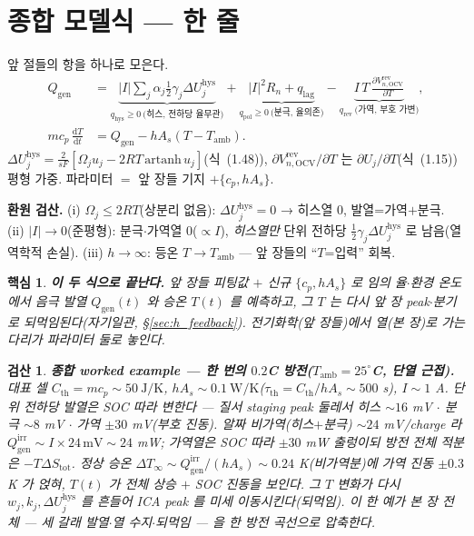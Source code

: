 \documentclass[11pt,a4paper]{article}
\newtheorem*{keybox}{핵심}
\newtheorem*{verifybox}{검산}
\newcommand{\dd}{\mathrm{d}}
\newcommand{\OCV}{\mathrm{OCV}}
\newcommand{\hys}{\mathrm{hys}}
\newcommand{\pol}{\mathrm{pol}}
\newcommand{\rev}{\mathrm{rev}}
\newcommand{\irr}{\mathrm{irr}}
\newcommand{\gen}{\mathrm{gen}}
\newcommand{\amb}{\mathrm{amb}}
\newcommand{\Th}{\mathrm{th}}
\newcommand{\lag}{\mathrm{lag}}
\begin{document}
\section{종합 모델식 — 한 줄}\label{sec:h_master}
앞 절들의 항을 하나로 모은다.
\begin{equation}
\boxed{\;\begin{aligned}
Q_\gen&=\underbrace{|I|\textstyle\sum_j\alpha_j\tfrac12\gamma_j\Delta U_j^\hys}_{q_\hys\ge0\ \text{(히스, 전하당 율무관)}}
+\underbrace{|I|^2R_n+q_\lag}_{q_\pol\ge0\ \text{(분극, 율의존)}}
-\underbrace{I\,T\,\frac{\partial V_{n,\OCV}^\rev}{\partial T}}_{q_\rev\ \text{(가역, 부호 가변)}},\\[3pt]
m c_p\,\frac{\dd T}{\dd t}&=Q_\gen-hA_s(T-T_\amb).
\end{aligned}\;}
\label{eq:h_master}
\end{equation}
$\Delta U_j^\hys=\tfrac{2}{sF}[\Omega_j u_j-2RT\,\mathrm{artanh}\,u_j]$(식~(1.48)), $\partial V_{n,\OCV}^\rev/\partial T$ 는
$\partial U_j/\partial T$(식~(1.15)) 평형 가중. 파라미터 $=$ 앞 장들 기지 $+\{c_p,hA_s\}$.

\textbf{환원 검산.} (i) $\Omega_j\le2RT$(상분리 없음): $\Delta U_j^\hys=0$ → 히스열 $0$, 발열=가역$+$분극. (ii)
$|I|\to0$(준평형): 분극$\cdot$가역열 $0$($\propto I$), \emph{히스열만} 단위 전하당 $\tfrac12\gamma_j\Delta U_j^\hys$ 로
남음(열역학적 손실). (iii) $h\to\infty$: 등온 $T\to T_\amb$ — 앞 장들의 ``$T$=입력'' 회복.
\begin{keybox}
\textbf{이 두 식으로 끝난다.} 앞 장들 피팅값 $+$ 신규 $\{c_p,hA_s\}$ 로 임의 율$\cdot$환경 온도에서 음극
발열 $Q_\gen(t)$ 와 승온 $T(t)$ 를 예측하고, 그 $T$ 는 다시 앞 장 peak$\cdot$분기로 되먹임된다(자기일관,
\S\ref{sec:h_feedback}). 전기화학(앞 장들)에서 열(본 장)로 가는 다리가 파라미터 \emph{둘}로 놓인다.
\end{keybox}
\begin{verifybox}
\textbf{종합 worked example — 한 번의 $0.2$C 방전($T_\amb=25^\circ$C, 단열 근접).} 대표 셀 $C_\Th=mc_p\sim50\
\mathrm{J/K}$, $hA_s\sim0.1\ \mathrm{W/K}$($\tau_\Th=C_\Th/hA_s\sim500$ s), $I\sim1$ A. 단위 전하당 발열은 SOC
따라 변한다 — 질서 staging peak 둘레서 히스 $\sim16$ mV $\cdot$ 분극 $\sim8$ mV $\cdot$ 가역 $\pm30$ mV(부호 진동).
알짜 비가역(히스$+$분극) $\sim24$ mV/charge 라 $Q_\gen^\irr\sim I\!\times\!24\,\mathrm{mV}\sim24$ mW; 가역열은 SOC
따라 $\pm30$ mW 출렁이되 방전 전체 적분은 $-T\Delta S_\mathrm{tot}$. 정상 승온 $\Delta T_\infty\sim Q_\gen^\irr/(hA_s)
\sim0.24$ K(비가역분)에 가역 진동 $\pm0.3$ K 가 얹혀, $T(t)$ 가 \emph{전체 상승 $+$ SOC 진동}을 보인다. 그 $T$
변화가 다시 $w_j,k_j,\Delta U_j^\hys$ 를 흔들어 ICA peak 를 미세 이동시킨다(되먹임). \emph{이 한 예가 본 장 전체 —
세 갈래 발열$\cdot$열 수지$\cdot$되먹임 — 을 한 방전 곡선으로 압축한다}.
\end{verifybox}
\end{document}
